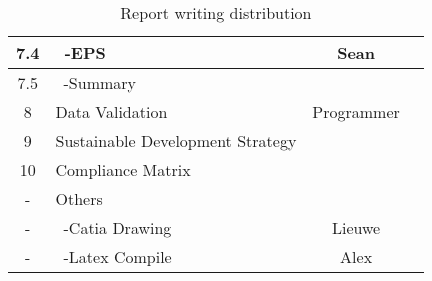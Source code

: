 \begin{table}[ht!]
{\begin{tabular}{|c|l|c|c|}
 7.4     & \ -EPS                               & Sean &\\\hline
 7.5     & \ -Summary                           &\\\hline\hline
 8       & Data Validation                      & Programmer &\\\hline
 9       & Sustainable Development Strategy     &\\\hline
 10      & Compliance Matrix                    &\\\hline\hline
 -       & Others                               &\\\hline
 -       & \ -Catia Drawing                     & Lieuwe &\\\hline
 -       & \ -Latex Compile                     & Alex &\\
 \hline
\end{tabular}
}
\caption{Report writing distribution}
\label{tab:RWD}
\end{table}

%

